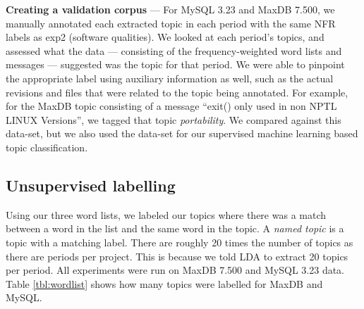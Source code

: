 \documentclass[]{sig-alternate}
\begin{document}
\noindent \textbf{Creating a validation corpus} --- For MySQL 3.23 and MaxDB 7.500, we manually annotated each extracted topic in each period with the same NFR labels as \textsf{exp2} (software qualities). 
We looked at each period's topics, and assessed what the data --- consisting of the frequency-weighted word lists and messages --- suggested was the topic for that period. 
We were able to pinpoint the appropriate label using auxiliary information as well, such as the actual revisions and files that were related to the topic being annotated.
For example, for the MaxDB topic consisting of a message ``exit() only used in non NPTL LINUX Versions'', we tagged that topic \emph{portability}. 
We compared against this data-set, but we also used the data-set for our supervised machine learning based topic classification. 


\subsection{Unsupervised labelling}
\label{sec:unsuplabelling}


Using our three word lists, we labeled our topics where there was a match between a word in the list and the same word in the topic.
A \emph{named topic} is a topic with a matching label. 
There are roughly 20 times the number of topics as there are periods per project. 
This is because we told LDA to extract 20 topics per period. 
All experiments were run on MaxDB 7.500 and MySQL 3.23 data.
Table \ref{tbl:wordlist} shows how many topics were labelled for MaxDB
and MySQL.
\end{document}
